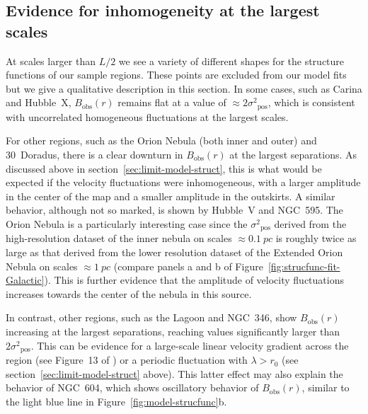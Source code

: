 \documentclass[fleqn,usenatbib, useAMS, a4paper]{mnras}
\newcommand\pos{\ensuremath{_{\mathrm{pos}}}}
\newcommand\obs{\ensuremath{_{\mathrm{obs}}}}
\begin{document}
\subsection{Evidence for inhomogeneity at the largest scales}
\label{sec:evid-inhom-at}

At scales larger than \(L/2\)
we see a variety of different shapes for the structure functions
of our sample regions.
These points are excluded from our model fits but we give
a qualitative description in this section.
In some cases,
such as Carina and Hubble~X,
\(B\obs(r)\) remains flat at a value of \(\approx 2\sigma^2\pos\),
which is consistent with uncorrelated homogeneous fluctuations
at the largest scales.

For other regions,
such as the Orion Nebula (both inner and outer) and 30~Doradus,
there is a clear downturn in \(B\obs(r)\) at the largest separations.
As discussed above in section~\ref{sec:limit-model-struct},
this is what would be expected if the velocity fluctuations
were inhomogeneous, with a larger amplitude in the center of the map
and a smaller amplitude in the outskirts.
A similar behavior, although not so marked, is shown by
Hubble~V and NGC~595.
The Orion Nebula is a particularly interesting case
since the \(\sigma^2\pos\) derived from the high-resolution dataset of the inner nebula on scales \(\approx \SI{0.1}{pc}\)
is roughly twice as large as that derived from the lower resolution
dataset of the Extended Orion Nebula on scales \(\approx \SI{1}{pc}\)
(compare panels a and b of Figure~\ref{fig:strucfunc-fit-Galactic}).
This is further evidence that the amplitude of velocity fluctuations
increases towards the center of the nebula in this source.

In contrast, other regions,
such as the Lagoon and NGC~346,
show \(B\obs(r)\) increasing at the largest separations,
reaching values significantly larger than \(2\sigma^2\pos\).
This can be evidence for a large-scale linear velocity gradient
across the region (see Figure~13 of \citealp{arthur2016turbulence})
or a periodic fluctuation with \(\lambda > r_0\)
(see section~\ref{sec:limit-model-struct} above).
This latter effect may also explain the behavior of NGC~604,
which shows oscillatory behavior of \(B\obs(r)\),
similar to the light blue line in Figure~\ref{fig:model-strucfunc}b.


\end{document}
